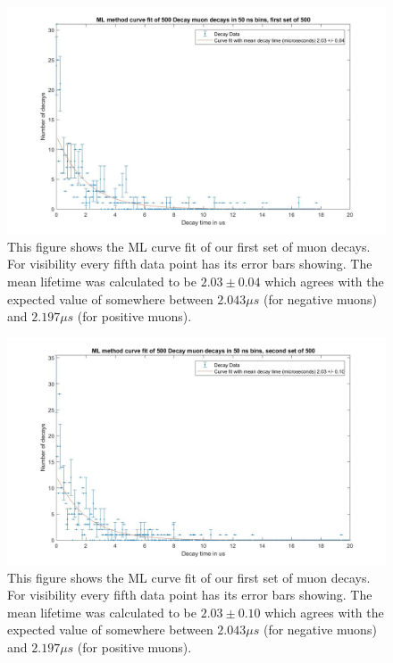\documentclass{article}
\begin{document}
\begin{figure}[H]
\includegraphics[scale=0.4,center]{ML_Curve_Fit_500a.jpg}
\caption{This figure shows the ML curve fit of our first set of muon decays.  For visibility every fifth data point has its error bars showing.  The mean lifetime was calculated to be $2.03 \pm 0.04$ which agrees with the expected value of somewhere between $2.043 \mu s$ (for negative muons) and $2.197 \mu s$ (for positive muons).}
\end{figure}

\begin{figure}[H]
\includegraphics[scale=0.4,center]{ML_Curve_Fit_500b.jpg}
\caption{This figure shows the ML curve fit of our first set of muon decays.  For visibility every fifth data point has its error bars showing.  The mean lifetime was calculated to be $2.03 \pm 0.10$ which agrees with the expected value of somewhere between $2.043 \mu s$ (for negative muons) and $2.197 \mu s$ (for positive muons).}
\end{figure}
\end{document}
